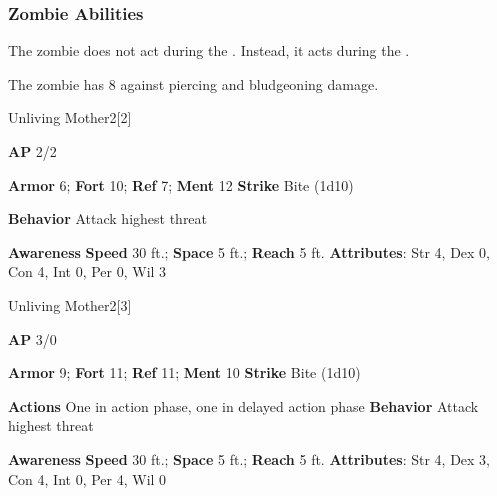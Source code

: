 \subsubsection{Zombie Abilities}

The zombie does not act during the .
Instead, it acts during the .

\vspace{0.5em}
The zombie has  8 against piercing and bludgeoning damage.

\begin{monsection}{Unliving Mother}{2}[2]
\vspace{-1em}\vspace{-1em}
\begin{spellcontent}
\begin{spelltargetinginfo}
{\textbf{AP} 2/2}

\pari \textbf{Armor} 6;
\textbf{Fort} 10;
\textbf{Ref} 7;
\textbf{Ment} 12
\pari \textbf{Strike} Bite  (1d10)



\pari \textbf{Behavior} Attack highest threat
\end{spelltargetinginfo}
\end{spellcontent}

\begin{monsterfooter}
\pari \textbf{Awareness} 
\pari \textbf{Speed} 30 ft.;
\textbf{Space} 5 ft.;
\textbf{Reach} 5 ft.
\pari \textbf{Attributes}:
Str 4,
Dex 0,
Con 4,
Int 0,
Per 0,
Wil 3
\end{monsterfooter}
\end{monsection}

\begin{monsection}{Unliving Mother}{2}[3]
\vspace{-1em}\vspace{-1em}
\begin{spellcontent}
\begin{spelltargetinginfo}
{\textbf{AP} 3/0}

\pari \textbf{Armor} 9;
\textbf{Fort} 11;
\textbf{Ref} 11;
\textbf{Ment} 10
\pari \textbf{Strike} Bite  (1d10)


\pari \textbf{Actions} One in action phase, one in delayed action phase
\pari \textbf{Behavior} Attack highest threat
\end{spelltargetinginfo}
\end{spellcontent}

\begin{monsterfooter}
\pari \textbf{Awareness} 
\pari \textbf{Speed} 30 ft.;
\textbf{Space} 5 ft.;
\textbf{Reach} 5 ft.
\pari \textbf{Attributes}:
Str 4,
Dex 3,
Con 4,
Int 0,
Per 4,
Wil 0
\end{monsterfooter}
\end{monsection}

